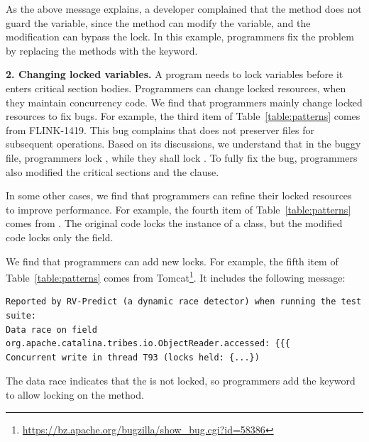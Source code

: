 As the above message explains, a developer complained that the  method does not guard the  variable, since the  method can modify the  variable, and the modification can bypass the lock. In this example, programmers fix the problem by replacing the methods with the  keyword.%



\noindent
\textbf{2. Changing locked variables.} A program needs to lock variables before it enters critical section bodies. Programmers can change locked resources, when they maintain concurrency code. We find that programmers mainly change locked resources to fix bugs. For example, the third item of Table~\ref{table:patterns} comes from FLINK-1419. This bug complains that  does not preserver files for subsequent operations. Based on its discussions, we understand that in the buggy file, programmers lock , while they shall lock . To fully fix the bug, programmers also modified the critical sections and the  clause.


In some other cases, we find that programmers can refine their locked resources to improve performance. For example, the fourth item of Table~\ref{table:patterns} comes from . The original code locks the instance of a class, but the modified code locks only the  field.

We find that programmers can add new locks. For example, the fifth item of Table~\ref{table:patterns} comes from Tomcat\footnote{\url{https://bz.apache.org/bugzilla/show\_bug.cgi?id=58386}}. It includes the following message:

\begin{lstlisting}
Reported by RV-Predict (a dynamic race detector) when running the test suite:
Data race on field org.apache.catalina.tribes.io.ObjectReader.accessed: {{{
Concurrent write in thread T93 (locks held: {...})
\end{lstlisting}

The data race indicates that the  is not locked, so programmers add the  keyword to allow locking on the method.

